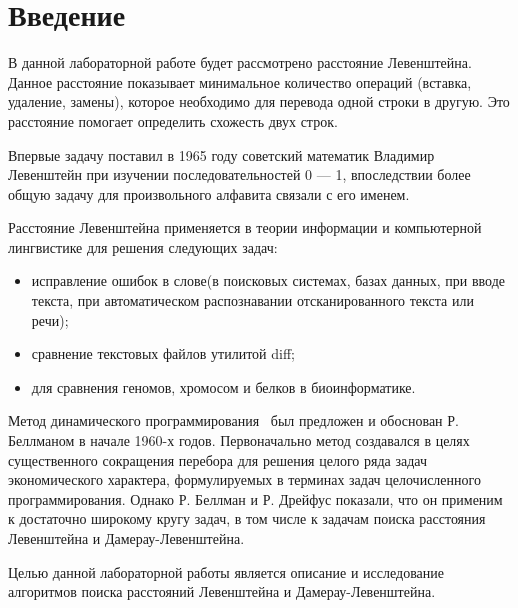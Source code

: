 \chapter*{Введение}

В данной лабораторной работе будет рассмотрено расстояние Левенштейна. 
Данное расстояние показывает минимальное количество операций (вставка, удаление, замены), которое необходимо для перевода одной строки в другую. Это расстояние помогает определить схожесть двух строк.

Впервые задачу поставил в 1965 году советский математик Владимир Левенштейн при изучении последовательностей 0 --- 1, впоследствии более общую задачу для произвольного алфавита связали с его именем.

Расстояние Левенштейна применяется в теории информации и компьютерной лингвистике для решения следующих задач:
\begin{itemize}[label=---]
	\item исправление ошибок в слове(в поисковых системах, базах данных, при вводе текста, при автоматическом распознавании отсканированного текста или речи);
	\item сравнение текстовых файлов утилитой diff;
	\item для сравнения геномов, хромосом и белков в биоинформатике.
\end{itemize}

Метод динамического программирования~\cite{ulianov} был предложен и обоснован Р. Беллманом в начале 1960-х годов. 
Первоначально метод создавался в целях существенного сокращения перебора для решения целого ряда задач экономического характера, формулируемых в терминах задач целочисленного программирования. 
Однако Р. Беллман и Р. Дрейфус показали, что он применим к достаточно широкому кругу задач, в том числе к задачам поиска расстояния Левенштейна и Дамерау-Левенштейна.


Целью данной лабораторной работы является описание и исследование алгоритмов поиска расстояний Левенштейна и Дамерау-Левенштейна.

